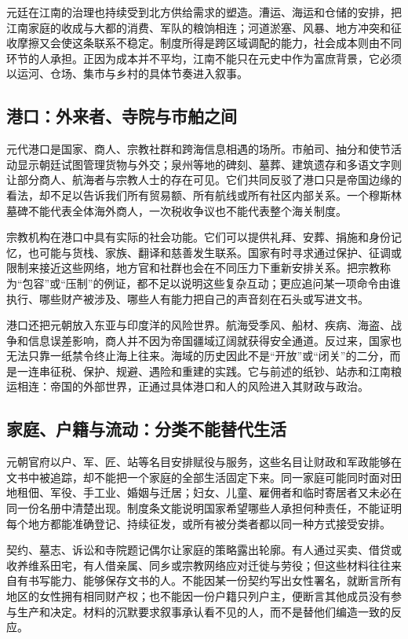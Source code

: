 元廷在江南的治理也持续受到北方供给需求的塑造。漕运、海运和仓储的安排，把江南家庭的收成与大都的消费、军队的粮饷相连；河道淤塞、风暴、地方冲突和征收摩擦又会使这条联系不稳定。制度所得是跨区域调配的能力，社会成本则由不同环节的人承担。正因为成本并不平均，江南不能只在元史中作为富庶背景，它必须以运河、仓场、集市与乡村的具体节奏进入叙事。

\subsection{港口：外来者、寺院与市舶之间}

元代港口是国家、商人、宗教社群和跨海信息相遇的场所。市舶司、抽分和使节活动显示朝廷试图管理货物与外交；泉州等地的碑刻、墓葬、建筑遗存和多语文字则让部分商人、航海者与宗教人士的存在可见。它们共同反驳了港口只是帝国边缘的看法，却不足以告诉我们所有贸易额、所有航线或所有社区内部关系。一个穆斯林墓碑不能代表全体海外商人，一次税收争议也不能代表整个海关制度。

宗教机构在港口中具有实际的社会功能。它们可以提供礼拜、安葬、捐施和身份记忆，也可能与货栈、家族、翻译和慈善发生联系。国家有时寻求通过保护、征调或限制来接近这些网络，地方官和社群也会在不同压力下重新安排关系。把宗教称为“包容”或“压制”的例证，都不足以说明这些复杂互动；更应追问某一项命令由谁执行、哪些财产被涉及、哪些人有能力把自己的声音刻在石头或写进文书。

港口还把元朝放入东亚与印度洋的风险世界。航海受季风、船材、疾病、海盗、战争和信息误差影响，商人并不因为帝国疆域辽阔就获得安全通道。反过来，国家也无法只靠一纸禁令终止海上往来。海域的历史因此不是“开放”或“闭关”的二分，而是一连串征税、保护、规避、遇险和重建的实践。它与前述的纸钞、站赤和江南粮运相连：帝国的外部世界，正通过具体港口和人的风险进入其财政与政治。

\subsection{家庭、户籍与流动：分类不能替代生活}

元朝官府以户、军、匠、站等名目安排赋役与服务，这些名目让财政和军政能够在文书中被追踪，却不能把一个家庭的全部生活固定下来。同一家庭可能同时面对田地租佃、军役、手工业、婚姻与迁居；妇女、儿童、雇佣者和临时寄居者又未必在同一份名册中清楚出现。制度条文能说明国家希望哪些人承担何种责任，不能证明每个地方都能准确登记、持续征发，或所有被分类者都以同一种方式接受安排。

契约、墓志、诉讼和寺院题记偶尔让家庭的策略露出轮廓。有人通过买卖、借贷或收养维系田宅，有人借亲属、同乡或宗教网络应对迁徙与劳役；但这些材料往往来自有书写能力、能够保存文书的人。不能因某一份契约写出女性署名，就断言所有地区的女性拥有相同财产权；也不能因一份户籍只列户主，便断言其他成员没有参与生产和决定。材料的沉默要求叙事承认看不见的人，而不是替他们编造一致的反应。

